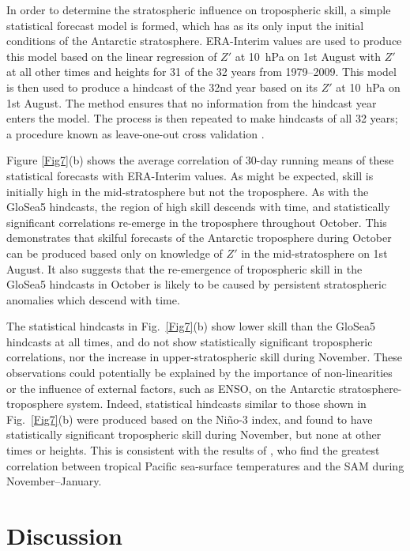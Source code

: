 In order to determine the stratospheric influence on tropospheric skill, a simple statistical forecast model is formed, which has as its only input the initial conditions of the Antarctic stratosphere. ERA-Interim values are used to produce this model based on the linear regression of $Z'$ at 10~hPa on 1st August with $Z'$ at all other times and heights for 31 of the 32 years from 1979--2009. This model is then used to produce a hindcast of the 32nd year based on its $Z'$ at 10~hPa on 1st August. The method ensures that no information from the hindcast year enters the model. The process is then repeated to make hindcasts of all 32 years; a procedure known as leave-one-out cross validation \citep{Wilks}. 

Figure \ref{Fig7}(b) shows the average correlation of 30-day running means of these statistical forecasts with ERA-Interim values. As might be expected, skill is initially high in the mid-stratosphere but not the troposphere. As with the GloSea5 hindcasts, the region of high skill descends with time, and statistically significant correlations re-emerge in the troposphere throughout October. This demonstrates that skilful forecasts of the Antarctic troposphere during October can be produced based only on knowledge of $Z'$ in the mid-stratosphere on 1st August. It also suggests that the re-emergence of tropospheric skill in the GloSea5 hindcasts in October is likely to be caused by persistent stratospheric anomalies which descend with time. 

The statistical hindcasts in Fig.\ \ref{Fig7}(b) show lower skill than the GloSea5 hindcasts at all times, and do not show statistically significant tropospheric correlations, nor the increase in upper-stratospheric skill during November. These observations could potentially be explained by the importance of non-linearities or the influence of external factors, such as ENSO, on the Antarctic stratosphere-troposphere system. Indeed, statistical hindcasts similar to those shown in Fig.\ \ref{Fig7}(b) were produced based on the Ni\~no-3 index, and found to have statistically significant tropospheric skill during November, but none at other times or heights. This is consistent with the results of \citet{Lim2013}, who find the greatest correlation between tropical Pacific sea-surface temperatures and the SAM during November--January.

\section{Discussion}

